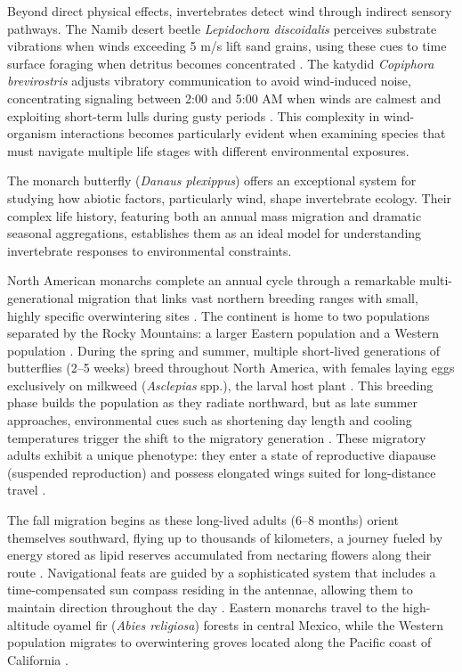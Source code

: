 Beyond direct physical effects, invertebrates detect wind through indirect sensory pathways. The Namib desert beetle \textit{Lepidochora discoidalis} perceives substrate vibrations when winds exceeding 5 m/s lift sand grains, using these cues to time surface foraging when detritus becomes concentrated \citep{hanrahanEffectWindForaging1997}. The katydid \textit{Copiphora brevirostris} adjusts vibratory communication to avoid wind-induced noise, concentrating signaling between 2:00 and 5:00 AM when winds are calmest and exploiting short-term lulls during gusty periods \citep{velillaGoneWindSignal2020}. This complexity in wind-organism interactions becomes particularly evident when examining species that must navigate multiple life stages with different environmental exposures.

The monarch butterfly (\textit{Danaus plexippus}) offers an exceptional system for studying how abiotic factors, particularly wind, shape invertebrate ecology. Their complex life history, featuring both an annual mass migration and dramatic seasonal aggregations, establishes them as an ideal model for understanding invertebrate responses to environmental constraints.

North American monarchs complete an annual cycle through a remarkable multi-generational migration that links vast northern breeding ranges with small, highly specific overwintering sites \citep{browerUnderstandingMisunderstandingMigration1995}. The continent is home to two populations separated by the Rocky Mountains: a larger Eastern population and a Western population \citep{browerUnderstandingMisunderstandingMigration1995}. During the spring and summer, multiple short-lived generations of butterflies (2--5 weeks) breed throughout North America, with females laying eggs exclusively on milkweed (\textit{Asclepias} spp.), the larval host plant \citep{browerUnderstandingMisunderstandingMigration1995}. This breeding phase builds the population as they radiate northward, but as late summer approaches, environmental cues such as shortening day length and cooling temperatures trigger the shift to the migratory generation \citep{reppertDemystifyingMonarchButterfly2018}. These migratory adults exhibit a unique phenotype: they enter a state of reproductive diapause (suspended reproduction) and possess elongated wings suited for long-distance travel \citep{barkerEffectPhotoperiodTemperature1976}.

The fall migration begins as these long-lived adults (6--8 months) orient themselves southward, flying up to thousands of kilometers, a journey fueled by energy stored as lipid reserves accumulated from nectaring flowers along their route \citep{chaplinEnergyReservesMetabolic1982}. Navigational feats are guided by a sophisticated system that includes a time-compensated sun compass residing in the antennae, allowing them to maintain direction throughout the day \citep{mouritsenVirtualMigrationTethered2002,reppertDemystifyingMonarchButterfly2018}. Eastern monarchs travel to the high-altitude oyamel fir (\textit{Abies religiosa}) forests in central Mexico, while the Western population migrates to overwintering groves located along the Pacific coast of California \citep{browerUnderstandingMisunderstandingMigration1995,Urquhart1978Autumnal}.

